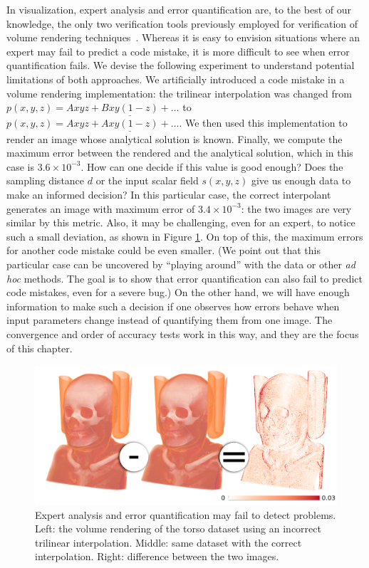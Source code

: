 In visualization, expert analysis and error quantification are, to the
best of our knowledge, the only two verification tools previously employed for
verification of volume rendering
techniques~\cite{Meissner:2000:PEP:353888.353903,
  Moller:1996:CLE:236226.236235,
  Smelyanskiy:2009:MHV:1638611.1639155}. Whereas it is easy to envision
situations where an expert may fail to predict a code mistake, it is
more difficult to see when error quantification fails.  We devise the
following experiment to understand potential limitations of both
approaches. We artificially introduced a code mistake in a volume
rendering implementation: the trilinear interpolation was changed from
$p(x,y,z) = Axyz + \underline{Bxy(1-z)} + \ldots$ to $p(x,y,z) = Axyz
+ \underline{Axy(1-z)} + \ldots$. We then used this implementation to
render an image whose analytical solution is known. Finally, we
compute the maximum error between the rendered and the analytical
solution, which in this case is $3.6 \times 10^{-3}$. How can one
decide if this value is good enough?  Does the sampling distance $d$
or the input scalar field $s(x,y,z)$ give us enough data to make an
informed decision? In this particular case, the correct interpolant
generates an image with maximum error of $3.4 \times 10^{-3}$: the two
images are very similar by this metric. Also, it may be challenging,
even for an expert, to notice such a small deviation, as shown in Figure
\ref{fig:error-quantification-examples}. On top of this, the maximum
errors for another code mistake could be even smaller.
%
(We point out that this particular case can be
uncovered by ``playing around'' with the data or other \emph{ad hoc}
methods. The goal 
is to show that error quantification
can also fail to predict code mistakes, even for a severe bug.)
%
On the other hand, we will have enough information to make such a
decision if one observes how errors behave when input parameters
change instead of quantifying them from one image. The convergence
and order of accuracy tests work in this way, and they are the focus
of this chapter.
%
\begin{figure}[t]
\centering
\includegraphics[width=0.75\linewidth]{chapter5/figures/torso-image.png}
\caption{\label{fig:error-quantification-examples}  Expert analysis and error quantification may fail to detect problems. 
Left: 
  the volume rendering of the torso dataset using an incorrect trilinear
  interpolation. Middle: same dataset with the correct 
  interpolation. Right: difference between the two images.}
\end{figure}

